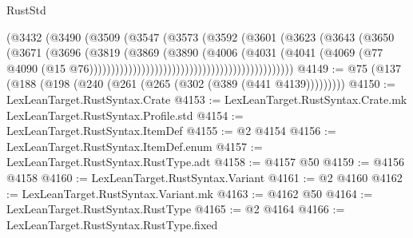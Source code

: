 \begin{lexlean}{RustStd}
\begin{coremodule}
{\begin{coremodule}
{{{{{{{{{{{{{{{{{{{{{{{{{{{{{{{{{{{{{{{{{{{{{{{{{{{{{{{{{{{{                                                        (@3432
                                                          (@3490
                                                            (@3509
                                                              (@3547
                                                                (@3573
                                                                  (@3592
                                                                    (@3601
                                                                      (@3623
                                                                        (@3643
                                                                          (@3650
                                                                            (@3671
                                                                              (@3696
                                                                                (@3819
                                                                                  (@3869
                                                                                    (@3890
                                                                                      (@4006
                                                                                        (@4031
                                                                                          (@4041
                                                                                            (@4069
                                                                                              (@77
                                                                                                @4090
                                                                                                (@15
                                                                                                  @76)))))))))))))))))))))))))))))))))))))))))))))))
@4149 := @75 (@137 (@188 (@198 (@240 (@261 (@265 (@302 (@389 (@441 @4139)))))))))
@4150 := LexLeanTarget.RustSyntax.Crate
@4153 := LexLeanTarget.RustSyntax.Crate.mk LexLeanTarget.RustSyntax.Profile.std
@4154 := LexLeanTarget.RustSyntax.ItemDef
@4155 := @2 @4154
@4156 := LexLeanTarget.RustSyntax.ItemDef.enum
@4157 := LexLeanTarget.RustSyntax.RustType.adt
@4158 := @4157 @50
@4159 := @4156 @4158
@4160 := LexLeanTarget.RustSyntax.Variant
@4161 := @2 @4160
@4162 := LexLeanTarget.RustSyntax.Variant.mk
@4163 := @4162 @50
@4164 := LexLeanTarget.RustSyntax.RustType
@4165 := @2 @4164
@4166 := LexLeanTarget.RustSyntax.RustType.fixed
}}}}}}}}}}}}}}}}}}}}}}}}}}}}}}}}}}}}}}}}}}}}}}}}}}}}}}}}}}}}
\end{coremodule}}
\end{coremodule}
\end{lexlean}
